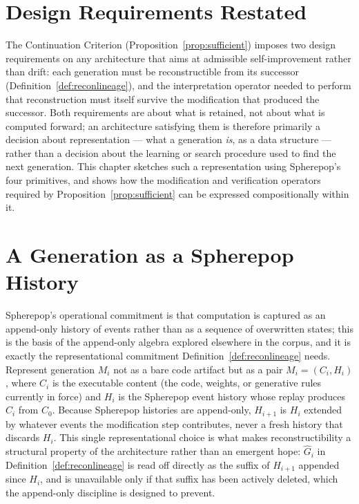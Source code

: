 \documentclass[11pt]{book}
\begin{document}
\section{Design Requirements Restated}

The Continuation Criterion (Proposition~\ref{prop:sufficient}) imposes two design requirements on any architecture that aims at admissible self-improvement rather than drift: each generation must be reconstructible from its successor (Definition~\ref{def:reconlineage}), and the interpretation operator needed to perform that reconstruction must itself survive the modification that produced the successor. Both requirements are about what is retained, not about what is computed forward; an architecture satisfying them is therefore primarily a decision about representation --- what a generation \emph{is}, as a data structure --- rather than a decision about the learning or search procedure used to find the next generation. This chapter sketches such a representation using Spherepop's four primitives, and shows how the modification and verification operators required by Proposition~\ref{prop:sufficient} can be expressed compositionally within it.

\section{A Generation as a Spherepop History}

Spherepop's operational commitment is that computation is captured as an append-only history of events rather than as a sequence of overwritten states; this is the basis of the append-only algebra explored elsewhere in the corpus, and it is exactly the representational commitment Definition~\ref{def:reconlineage} needs. Represent generation $M_i$ not as a bare code artifact but as a pair $M_i = (C_i, H_i)$, where $C_i$ is the executable content (the code, weights, or generative rules currently in force) and $H_i$ is the Spherepop event history whose replay produces $C_i$ from $C_0$. Because Spherepop histories are append-only, $H_{i+1}$ is $H_i$ extended by whatever events the modification step contributes, never a fresh history that discards $H_i$. This single representational choice is what makes reconstructibility a structural property of the architecture rather than an emergent hope: $\widehat{G}_i$ in Definition~\ref{def:reconlineage} is read off directly as the suffix of $H_{i+1}$ appended since $H_i$, and is unavailable only if that suffix has been actively deleted, which the append-only discipline is designed to prevent.
\end{document}
